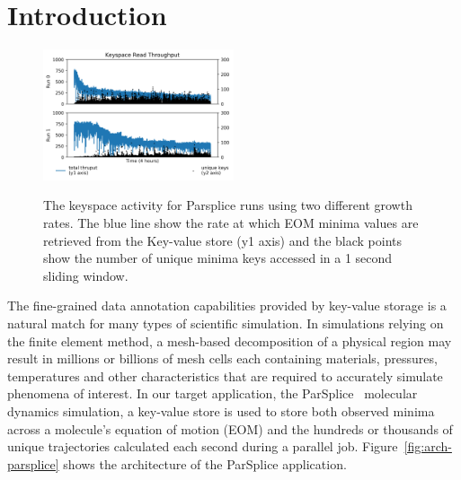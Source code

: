 \section{Introduction}


\begin{figure}[t]
  \noindent\includegraphics[width=0.5\textwidth]{figures/futurework-regimes.png}\\
  \caption{The keyspace activity for Parsplice runs using two different growth 
  rates.  The blue line show the rate at which EOM minima values are retrieved
  from the Key-value store (y1 axis) and the black points show the number of
  unique minima keys accessed in a 1 second sliding window. 
  \label{fig:futurework-regimes}}
\end{figure}

The fine-grained data annotation capabilities provided by key-value storage is
a natural match for many types of scientific simulation. In simulations relying
on the finite element method, a mesh-based decomposition of a physical region
may result in millions or billions of mesh cells each containing materials,
pressures, temperatures and other characteristics that are required to
accurately simulate phenomena of interest. In our target application, the
ParSplice~\cite{perez:jctc20150parsplice} molecular dynamics simulation, a
key-value store is used to store both observed minima across a molecule's
equation of motion (EOM) and the hundreds or thousands of unique trajectories
calculated each second during a parallel job. Figure~\ref{fig:arch-parsplice}
shows the architecture of the ParSplice application.

